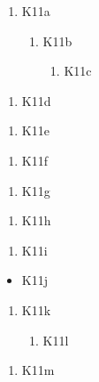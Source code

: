 \documentclass[11pt]{article}
\newlength{\mylen}
\newlength{\fixlen}
\begin{document}
\begin{enumerate}[label=\arabic*.]
\item K11a
\begin{enumerate}[label=(\alph*)]
\item K11b
\begin{enumerate}[label=\roman*.,itemsep=0pt]
\item K11c
\end{enumerate}
\end{enumerate}
\end{enumerate}
\begin{enumerate}[labelsep=1em]
\item K11d
\end{enumerate}
\begin{enumerate}[itemindent=1em]
\item K11e
\end{enumerate}
\begin{enumerate}[label=\roman*.,leftmargin=*,widest=iii]
\item K11f
\end{enumerate}
\begin{enumerate}[leftmargin=\mylen]
\item K11g
\end{enumerate}
\begin{enumerate}[leftmargin=*,labelsep=1em]
\item K11h
\end{enumerate}
\begin{enumerate}[leftmargin=*,itemindent=6pt]
\item K11i
\end{enumerate}
\begin{itemize}[leftmargin=*,widest=WW]
\item K11j
\end{itemize}
\begin{enumerate}[leftmargin=*,labelsep=2em]
\item K11k
\begin{enumerate}[leftmargin=*]
\item K11l
\end{enumerate}
\end{enumerate}
\begin{enumerate}[leftmargin=\fixlen]
\item K11m
\end{enumerate}
\end{document}
